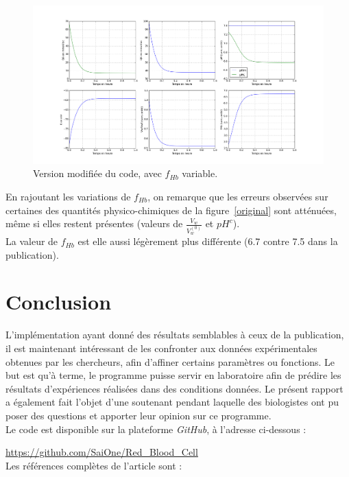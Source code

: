 \documentclass[a4paper,fleqn]{article}
\begin{document}
\begin{figure}[H]
\centering 
\includegraphics[width=1.1\textwidth]{avec_fhb.png}
\caption{Version modifiée du code, avec $f_{Hb}$ variable.}
\end{figure} 

En rajoutant les variations de $f_{Hb}$, on remarque que les erreurs observées sur certaines des quantités physico-chimiques de la figure~\ref{original} sont atténuées, même si elles restent présentes (valeurs de $\frac{V_w}{V_w^{(0)}}$ et $pH^c$). \\

La valeur de $f_{Hb}$ est elle aussi légèrement plus différente (6.7 contre 7.5 dans la publication).\\


\section{Conclusion} 

L'implémentation ayant donné des résultats semblables à ceux de la publication, il est maintenant intéressant de les confronter aux données expérimentales obtenues par les chercheurs, afin d'affiner certains paramètres ou fonctions. Le but est qu'à terme, le programme puisse servir en laboratoire afin de prédire les résultats d'expériences réalisées dans des conditions données. Le présent rapport a également fait l'objet d'une soutenant pendant laquelle des biologistes ont pu poser des questions et apporter leur opinion sur ce programme. \\

Le code est disponible sur la plateforme \textit{GitHub}, à l'adresse ci-dessous :

\url{https://github.com/SaiOne/Red_Blood_Cell}\\

Les références complètes de l'article sont :
\end{document}
